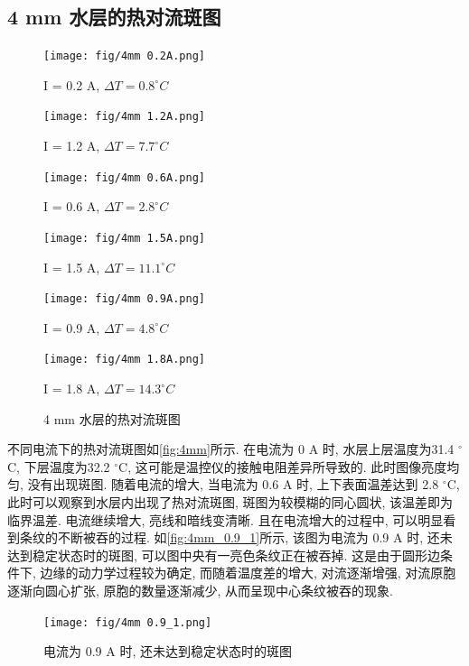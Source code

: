 \documentclass[font=default]{mpltx}
\begin{document}
  \subsection{4 mm 水层的热对流斑图}
  \begin{figure}[htbp]
    \begin{minipage}{0.32\linewidth}
      \vspace{3pt}
      \centerline{\texttt{[image: fig/4mm 0.2A.png]}}
      \centerline{I = 0.2 A, $\Delta T = 0.8^\circ C$}
      \vspace{3pt}
      \centerline{\texttt{[image: fig/4mm 1.2A.png]}}
      \centerline{I = 1.2 A, $\Delta T = 7.7^\circ C$}
    \end{minipage}
    \begin{minipage}{0.32\linewidth}
      \vspace{3pt}
      \centerline{\texttt{[image: fig/4mm 0.6A.png]}}
      \centerline{I = 0.6 A, $\Delta T = 2.8^\circ C$}
      \vspace{3pt}
      \centerline{\texttt{[image: fig/4mm 1.5A.png]}}
      \centerline{I = 1.5 A, $\Delta T = 11.1^\circ C$}
    \end{minipage}
    \begin{minipage}{0.32\linewidth}
      \vspace{3pt}
      \centerline{\texttt{[image: fig/4mm 0.9A.png]}}
      \centerline{I = 0.9 A, $\Delta T = 4.8^\circ C$}
      \vspace{3pt}
      \centerline{\texttt{[image: fig/4mm 1.8A.png]}}
      \centerline{I = 1.8 A, $\Delta T = 14.3^\circ C$}
    \end{minipage}
    \caption{4 mm 水层的热对流斑图}
    \label{fig:4mm}
  \end{figure}
  不同电流下的热对流斑图如\autoref{fig:4mm}所示.
  在电流为 0 A 时, 水层上层温度为31.4 $^\circ$C, 下层温度为32.2 $^\circ$C, 这可能是温控仪的接触电阻差异所导致的. 此时图像亮度均匀, 没有出现斑图.
  随着电流的增大, 当电流为 0.6 A 时, 上下表面温差达到 2.8 $^\circ$C, 此时可以观察到水层内出现了热对流斑图, 斑图为较模糊的同心圆状, 该温差即为临界温差.
  电流继续增大, 亮线和暗线变清晰.
  且在电流增大的过程中, 可以明显看到条纹的不断被吞的过程. 如\autoref{fig:4mm_0.9_1}所示, 该图为电流为 0.9 A 时, 还未达到稳定状态时的斑图, 
  可以图中央有一亮色条纹正在被吞掉. 这是由于圆形边条件下, 边缘的动力学过程较为确定, 而随着温度差的增大, 对流逐渐增强, 对流原胞逐渐向圆心扩张, 原胞的数量逐渐减少,
  从而呈现中心条纹被吞的现象.

  \begin{figure}[htbp]
    \centering
    \texttt{[image: fig/4mm 0.9\_1.png]}
    \caption{电流为 0.9 A 时, 还未达到稳定状态时的斑图}
    \label{fig:4mm_0.9_1}
  \end{figure}
\end{document}
